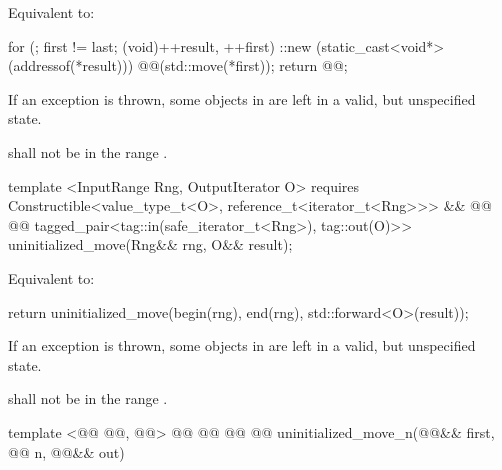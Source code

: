 \setcounter{Paras}{0}
\pnum
\effects Equivalent to:
\begin{codeblock}
        for (; first != last; (void)++result, ++first)
          ::new (static_cast<void*>(addressof(*result)))
            @@(std::move(*first));
        return @@;
\end{codeblock}

\pnum
\remarks If an exception is thrown, some objects in \tcode{[first, last)} are left in a valid, but unspecified state.

{\color{addclr}
\pnum
\requires {} shall not be in the range \tcode{[first, last)}.

\begin{codeblock}
  template <InputRange Rng, OutputIterator O>
    requires Constructible<value_type_t<O>, reference_t<iterator_t<Rng>>> &&
             @@
             @@
  tagged_pair<tag::in(safe_iterator_t<Rng>), tag::out(O)>>
    uninitialized_move(Rng&& rng, O&& result);
\end{codeblock}

\pnum
\effects Equivalent to:
\begin{codeblock}
        return uninitialized_move(begin(rng), end(rng), std::forward<O>(result));
\end{codeblock}

\pnum
\remarks If an exception is thrown, some objects in \tcode{[first, last)} are left in a valid, but unspecified state.

\pnum
\requires {} shall not be in the range \tcode{[first, last)}.
} %

\begin{codeblock}
  template <@@ @@, @@>
    @@
             @@
             @@
  @@
    uninitialized_move_n(@@&& first, @@ n, @@&& out)
\end{codeblock}


